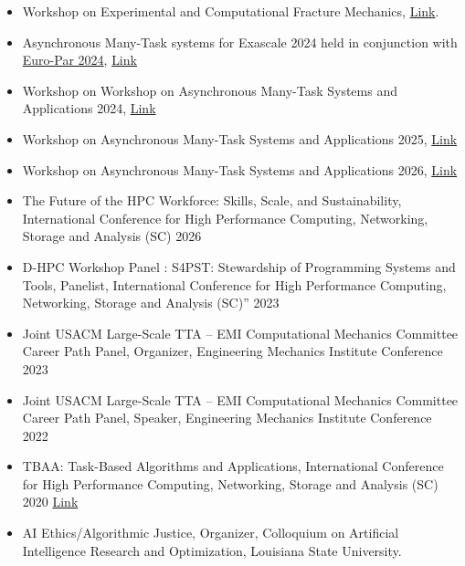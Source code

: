 \documentclass[11pt,a4paper,sans]{moderncv}
\begin{document}
\begin{itemize}[leftmargin=4cm]
\item Workshop on Experimental and Computational Fracture Mechanics, \href{http://wfm2024.usacm.org/}{Link}.
\item Asynchronous Many-Task systems for Exascale 2024 held in conjunction with \href{https://2024.euro-par.org/}{Euro-Par 2024},  \href{https://amte-workshop.github.io/2024/}{Link}
\item Workshop on Workshop on Asynchronous Many-Task Systems and Applications 2024,  \href{http://wamta24.icl.utk.edu/}{Link}
\item Workshop on Asynchronous Many-Task Systems and Applications 2025, \href{https://wamta25.github.io/}{Link}
\item Workshop on Asynchronous Many-Task Systems and Applications 2026, \href{https://wamta26.stellar-group.org/}{Link}
\end{itemize}

\begin{itemize}[leftmargin=4cm]
\item The Future of the HPC Workforce: Skills, Scale, and Sustainability, International Conference for High Performance Computing, Networking, Storage and Analysis (SC) 2026
\item D-HPC Workshop Panel : S4PST: Stewardship of Programming Systems and Tools, Panelist, International Conference for High Performance Computing, Networking, Storage and Analysis (SC)” 2023
\item Joint USACM Large-Scale TTA – EMI Computational Mechanics Committee Career Path Panel, Organizer, Engineering Mechanics Institute Conference 2023
\item Joint USACM Large-Scale TTA – EMI Computational Mechanics Committee Career Path Panel, Speaker, Engineering Mechanics Institute Conference 2022
\item TBAA: Task-Based Algorithms and Applications, International Conference for High Performance Computing, Networking, Storage and Analysis (SC) 2020 \href{https://stellar-group.org/research/tbaa2020-scpanel/}{Link}
\item AI Ethics/Algorithmic Justice, Organizer, Colloquium on Artificial Intelligence Research and Optimization,  Louisiana State University. 
\end{itemize}
\end{document}
